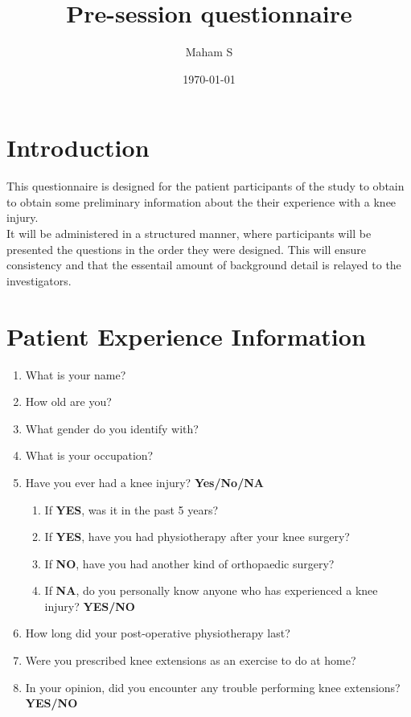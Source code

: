 \documentclass{article}
\title{Pre-session questionnaire}
\author{Maham S}
\date{\today}
\begin{document}
\maketitle
\newpage
\tableofcontents
\newpage



\section{\textbf{Introduction}}
This questionnaire is designed for the patient participants of the study to obtain to obtain 
some preliminary information about the their experience with a knee injury. \\
It will be administered in a structured manner, where participants will be presented the questions 
in the order they were designed. This will ensure consistency and that the essentail amount of
background detail is relayed to the investigators.



\section{\textbf{Patient Experience Information}}
\begin{enumerate}
    \item What is your name?
    \item How old are you?
    \item What gender do you identify with? 
    \item What is your occupation?
    \item Have you ever had a knee injury? \textbf{Yes/No/NA}
    \begin{enumerate}
        \item If \textbf{YES}, was it in the past 5 years?
        \item If \textbf{YES}, have you had physiotherapy after your knee surgery?
        \item If \textbf{NO}, have you had another kind of orthopaedic surgery?
        \item If \textbf{NA}, do you personally know anyone who has experienced a knee injury? \textbf{YES/NO}
    \end{enumerate}
    \item How long did your post-operative physiotherapy last?
    \item Were you prescribed knee extensions as an exercise to do at home?
    \item In your opinion, did you encounter any trouble performing knee extensions? \textbf{YES/NO}
\end{enumerate}
\end{document}
